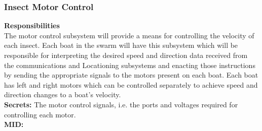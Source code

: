\documentclass[11pt]{article}
\begin{document}
\subsubsection{Insect Motor Control}
\textbf{Responsibilities}\\
The motor control subsystem will provide a means for controlling the velocity of each insect.
Each boat in the swarm will have this subsystem which will be responsible for interpreting the
desired speed and direction data received from the communications and Locationing subsystems
and enacting those instructions by sending the appropriate signals to the motors present on each
boat. Each boat has left and right motors which can be controlled separately to achieve speed and direction changes to a boat's velocity. \\
\newline
\textbf{Secrets: } The motor control signals, i.e. the ports and voltages required for controlling each motor. \\
\newline
\textbf{MID:}
\end{document}
